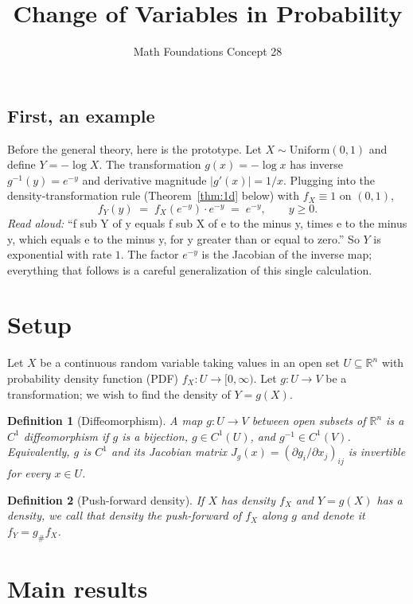 \documentclass[11pt]{article}
\title{Change of Variables in Probability}
\author{Math Foundations \textendash{} Concept 28}
\date{}
\newtheorem{definition}{Definition}
\begin{document}
\maketitle

\subsection*{First, an example}

Before the general theory, here is the prototype. Let $X \sim \mathrm{Uniform}(0,1)$
and define $Y = -\log X$. The transformation $g(x) = -\log x$ has inverse
$g^{-1}(y) = e^{-y}$ and derivative magnitude $|g'(x)| = 1/x$. Plugging into the
density-transformation rule (Theorem~\ref{thm:1d} below) with $f_X \equiv 1$ on $(0,1)$,
\[
f_Y(y) \;=\; f_X(e^{-y}) \cdot e^{-y} \;=\; e^{-y}, \qquad y \ge 0.
\]
\emph{Read aloud:} ``f sub Y of y equals f sub X of e to the minus y, times e to the minus y, which equals e to the minus y, for y greater than or equal to zero.''
So $Y$ is exponential with rate $1$. The factor $e^{-y}$ is the Jacobian of the inverse
map; everything that follows is a careful generalization of this single calculation.

\section{Setup}

Let $X$ be a continuous random variable taking values in an open set $U \subseteq \mathbb{R}^n$
with probability density function (PDF) $f_X : U \to [0,\infty)$. Let $g : U \to V$
be a transformation; we wish to find the density of $Y = g(X)$.

\begin{definition}[Diffeomorphism]
A map $g : U \to V$ between open subsets of $\mathbb{R}^n$ is a $C^1$ \emph{diffeomorphism}
if $g$ is a bijection, $g \in C^1(U)$, and $g^{-1} \in C^1(V)$. Equivalently, $g$ is $C^1$
and its Jacobian matrix $J_g(x) = (\partial g_i/\partial x_j)_{ij}$ is invertible for every $x \in U$.
\end{definition}

\begin{definition}[Push-forward density]
If $X$ has density $f_X$ and $Y = g(X)$ has a density, we call that density the
\emph{push-forward} of $f_X$ along $g$ and denote it $f_Y = g_\# f_X$.
\end{definition}

\section{Main results}
\end{document}
